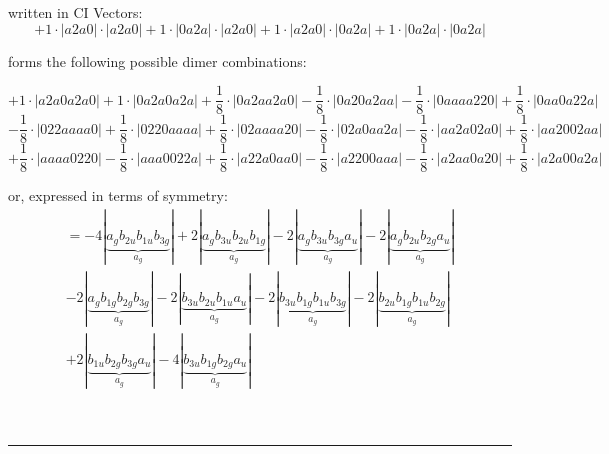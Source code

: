\documentclass{article}
\begin{document}
\begin{minipage}{\linewidth}
written in CI Vectors: 
 $$+ 1 \cdot \left|a2a0 \right| \cdot \left| a2a0 \right| 
+ 1 \cdot \left|0a2a \right| \cdot \left| a2a0 \right| 
+ 1 \cdot \left|a2a0 \right| \cdot \left| 0a2a \right| 
+ 1 \cdot \left|0a2a \right| \cdot \left| 0a2a \right| 
$$



 forms the following possible dimer combinations:

$$+ 1 \cdot \left|a2a0a2a0 \right| + 1 \cdot \left|0a2a0a2a \right| + \frac{1}{8} \cdot \left|0a2aa2a0 \right| - \frac{1}{8} \cdot \left|0a20a2aa \right| - \frac{1}{8} \cdot \left|0aaaa220 \right| + \frac{1}{8} \cdot \left|0aa0a22a \right|  $$ $$ - \frac{1}{8} \cdot \left|022aaaa0 \right| + \frac{1}{8} \cdot \left|0220aaaa \right| + \frac{1}{8} \cdot \left|02aaaa20 \right| - \frac{1}{8} \cdot \left|02a0aa2a \right| - \frac{1}{8} \cdot \left|aa2a02a0 \right| + \frac{1}{8} \cdot \left|aa2002aa \right|  $$ $$ + \frac{1}{8} \cdot \left|aaaa0220 \right| - \frac{1}{8} \cdot \left|aaa0022a \right| + \frac{1}{8} \cdot \left|a22a0aa0 \right| - \frac{1}{8} \cdot \left|a2200aaa \right| - \frac{1}{8} \cdot \left|a2aa0a20 \right| + \frac{1}{8} \cdot \left|a2a00a2a \right| $$



\end{minipage}
\vspace{0.5cm}


or, expressed in terms of symmetry:\begin{multline*}
=-4\left|\underbrace{a_{g} b_{2u} b_{1u} b_{3g}}_{a_{g}}\right|+2\left|\underbrace{a_{g} b_{3u} b_{2u} b_{1g}}_{a_{g}}\right|-2\left|\underbrace{a_{g} b_{3u} b_{3g} a_{u}}_{a_{g}}\right|-2\left|\underbrace{a_{g} b_{2u} b_{2g} a_{u}}_{a_{g}}\right|\\
-2\left|\underbrace{a_{g} b_{1g} b_{2g} b_{3g}}_{a_{g}}\right|-2\left|\underbrace{b_{3u} b_{2u} b_{1u} a_{u}}_{a_{g}}\right|-2\left|\underbrace{b_{3u} b_{1g} b_{1u} b_{3g}}_{a_{g}}\right|-2\left|\underbrace{b_{2u} b_{1g} b_{1u} b_{2g}}_{a_{g}}\right|\\
+2\left|\underbrace{b_{1u} b_{2g} b_{3g} a_{u}}_{a_{g}}\right|-4\left|\underbrace{b_{3u} b_{1g} b_{2g} a_{u}}_{a_{g}}\right|
\end{multline*}\\\\

 


\hrule
\vspace{0.5cm}
\end{document}

